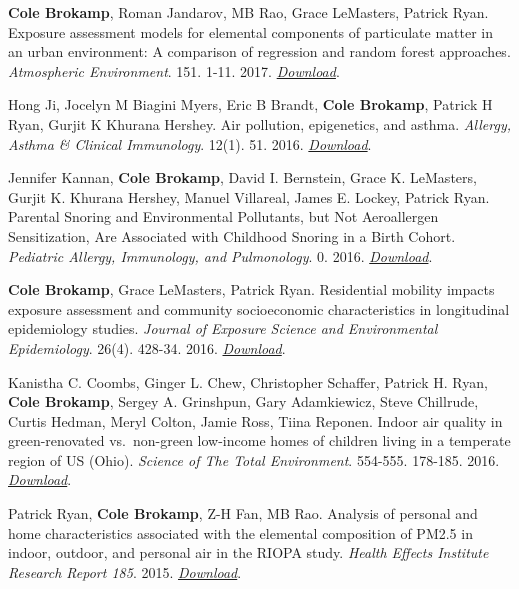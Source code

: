 \textbf{Cole Brokamp}, Roman Jandarov, MB Rao, Grace LeMasters, Patrick
Ryan. Exposure assessment models for elemental components of particulate
matter in an urban environment: A comparison of regression and random
forest approaches. \emph{Atmospheric Environment}. 151. 1-11. 2017.
\href{http://colebrokamp-website.s3.amazonaws.com/publications/Brokamp_AtmosEnv_2017.pdf}{\emph{Download}}.

Hong Ji, Jocelyn M Biagini Myers, Eric B Brandt, \textbf{Cole Brokamp},
Patrick H Ryan, Gurjit K Khurana Hershey. Air pollution, epigenetics,
and asthma. \emph{Allergy, Asthma \& Clinical Immunology}. 12(1). 51.
2016.
\href{http://colebrokamp-website.s3.amazonaws.com/publications/Ji_AllergyAsthmaClinImmunol_2016.pdf}{\emph{Download}}.

Jennifer Kannan, \textbf{Cole Brokamp}, David I. Bernstein, Grace K.
LeMasters, Gurjit K. Khurana Hershey, Manuel Villareal, James E. Lockey,
Patrick Ryan. Parental Snoring and Environmental Pollutants, but Not
Aeroallergen Sensitization, Are Associated with Childhood Snoring in a
Birth Cohort. \emph{Pediatric Allergy, Immunology, and Pulmonology}. 0.
2016.
\href{http://colebrokamp-website.s3.amazonaws.com/publications/Kannan_PedAllImmPul_2016.pdf}{\emph{Download}}.

\textbf{Cole Brokamp}, Grace LeMasters, Patrick Ryan. Residential
mobility impacts exposure assessment and community socioeconomic
characteristics in longitudinal epidemiology studies. \emph{Journal of
Exposure Science and Environmental Epidemiology}. 26(4). 428-34. 2016.
\href{http://colebrokamp-website.s3.amazonaws.com/publications/Brokamp_JESEE_2016.pdf}{\emph{Download}}.

Kanistha C. Coombs, Ginger L. Chew, Christopher Schaffer, Patrick H.
Ryan, \textbf{Cole Brokamp}, Sergey A. Grinshpun, Gary Adamkiewicz,
Steve Chillrude, Curtis Hedman, Meryl Colton, Jamie Ross, Tiina Reponen.
Indoor air quality in green-renovated vs.~non-green low-income homes of
children living in a temperate region of US (Ohio). \emph{Science of The
Total Environment}. 554-555. 178-185. 2016.
\href{http://colebrokamp-website.s3.amazonaws.com/publications/Coombs_SciTotEnv_2016.pdf}{\emph{Download}}.

Patrick Ryan, \textbf{Cole Brokamp}, Z-H Fan, MB Rao. Analysis of
personal and home characteristics associated with the elemental
composition of PM2.5 in indoor, outdoor, and personal air in the RIOPA
study. \emph{Health Effects Institute Research Report 185}. 2015.
\href{http://colebrokamp-website.s3.amazonaws.com/publications/Ryan_HEIReport_2015.pdf}{\emph{Download}}.

